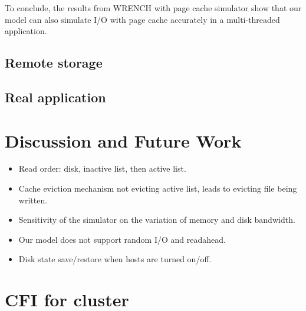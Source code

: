 \documentclass[conference]{IEEEtran}
\begin{document}
			To conclude, the results from WRENCH with page cache simulator show that 
			our model can also simulate I/O with page cache accurately in a 
			multi-threaded application.  
			
		\subsection{Remote storage}
		
		\subsection{Real application}


	\section{Discussion and Future Work}
		\begin{itemize}
			\item Read order: disk, inactive list, then active list. 
			\item Cache eviction mechanism not evicting active list, leads to evicting file being written.
			\item Sensitivity of the simulator on the variation of memory and disk bandwidth. 
			\item Our model does not support random I/O and readahead.
			\item Disk state save/restore when hosts are turned on/off.
		\end{itemize}
	\section{CFI for cluster}


\end{document}
